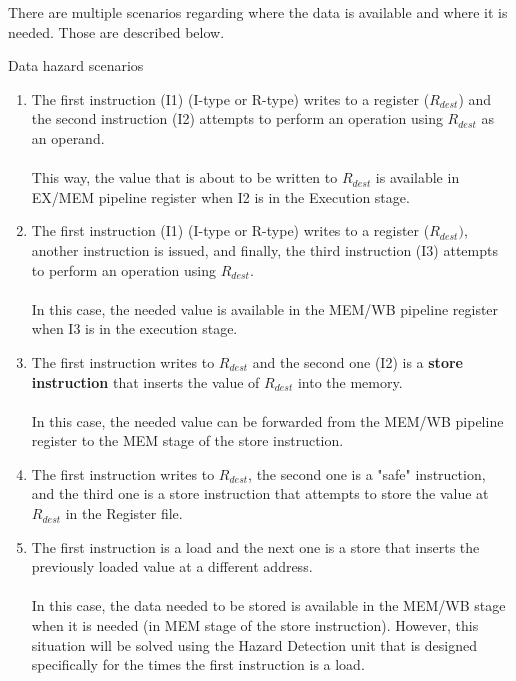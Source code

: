 \documentclass[a4paper,12pt]{report}
\begin{document}
There are multiple scenarios regarding where the data is available and where it is needed. Those are described below.\\

\begin{my-list}{Data hazard scenarios}
    \begin{enumerate}
        \item The first instruction (I1) (I-type or R-type) writes to a register ($R_{dest}$) and the second instruction (I2) attempts to perform an operation using $R_{dest}$ as an operand.\\
        \\This way, the value that is about to be written to $R_{dest}$ is available in EX/MEM pipeline register when I2 is in the Execution stage.
        \item The first instruction (I1) (I-type or R-type) writes to a register ($R_{dest})$, another instruction is issued, and finally, the third instruction (I3) attempts to perform an operation using $R_{dest}$.\\
        \\In this case, the needed value is available in the MEM/WB pipeline register when I3 is in the execution stage.
        \item The first instruction writes to $R_{dest}$ and the second one (I2) is a \textbf{store instruction} that inserts the value of $R_{dest}$ into the memory.\\
        \\In this case, the needed value can be forwarded from the MEM/WB pipeline register to the MEM stage of the store instruction. 
        
        \item The first instruction writes to $R_{dest}$, the second one is a "safe" instruction, and the third one is a store instruction that attempts to store the value at $R_{dest}$ in the Register file.
        
        \item The first instruction is a load and the next one is a store that inserts the previously loaded value at a different address.\\
        \\In this case, the data needed to be stored is available in the MEM/WB stage when it is needed (in MEM stage of the store instruction). However, this situation will be solved using the Hazard Detection unit that is designed specifically for the times the first instruction is a load.
    \end{enumerate}
\end{my-list}
\end{document}
